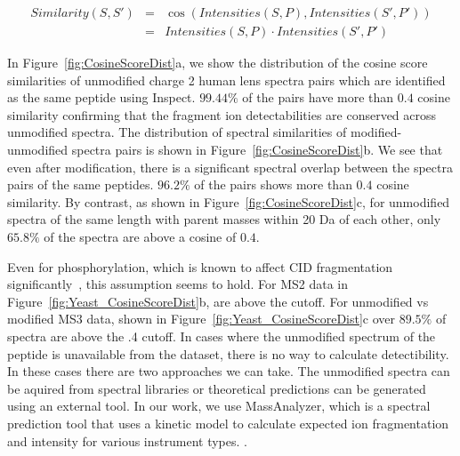 \begin{eqnarray*}
Similarity(S,S') & = & \cos(Intensities(S,P),Intensities(S',P')) \\
                      & = & Intensities(S,P) \cdot Intensities(S',P')
\end{eqnarray*}

In Figure~\ref{fig:CosineScoreDist}a, we show the distribution of the
cosine score similarities of unmodified charge 2 human lens spectra pairs which are
identified as the same peptide using Inspect. $99.44\%$ of the pairs
have more than $0.4$ cosine similarity confirming that the fragment
ion detectabilities are conserved across unmodified spectra. 
The distribution of spectral similarities of modified-unmodified spectra pairs is shown in
Figure~\ref{fig:CosineScoreDist}b. We see that even after modification, there is a significant 
spectral overlap between the spectra pairs of the same peptides. $96.2\%$ of the pairs shows more
than $0.4$ cosine similarity. By contrast, as shown in Figure~\ref{fig:CosineScoreDist}c, for unmodified
 spectra of the same length with parent masses within 20 Da of each other, only $65.8\%$ of the spectra are above a cosine of $0.4$. 
 
 Even for phosphorylation, which is known to affect CID fragmentation significantly~\cite{Tholey1999,Moyer2002}, 
 this assumption seems to hold. For MS2 data in Figure~\ref{fig:Yeast_CosineScoreDist}b, 
  are above the cutoff. For unmodified vs modified MS3 data, shown in Figure~\ref{fig:Yeast_CosineScoreDist}c over 
 $89.5\%$ of spectra are above the .4 cutoff. In cases where the unmodified spectrum of the peptide is unavailable from the 
dataset, there is no way to calculate detectibility. In these
cases there are two approaches we can take. The unmodified spectra can be aquired from 
spectral libraries or theoretical predictions can be generated using an external tool.
In our work, we use MassAnalyzer, which is a spectral prediction tool that uses a kinetic model to calculate expected ion fragmentation and
 intensity for various instrument types. \cite{zhang04,zhang05,zhang10}. 
 
